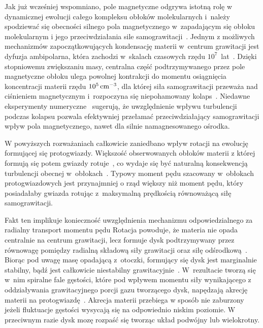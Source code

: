 \par Jak już wcześniej wspomniano, pole magnetyczne odgrywa istotną rolę w
dynamicznej ewolucji całego kompleksu obłoków molekularnych i~należy spodziewać
się obecności silnego pola magnetycznego w~zapadającym się obłoku molekularnym i
jego przeciwdziałania sile samograwitacji~\cite{MC99}. Jednym z możliwych
mechanizmów zapoczątkowujących kondensację materii w~centrum grawitacji jest
dyfuzja ambipolarna, która zachodzi w~skalach czasowych rzędu
$10^7$~lat~\cite{MZGH93}.  Dzięki stopniowemu zwiększaniu masy, centralna część
podtrzymywanego przez pole magnetyczne obłoku ulega powolnej kontrakcji do
momentu osiągnięcia koncentracji materii rzędu $10^{5}\hbox{$\thinspace\textrm{cm}$}^{-3}$, dla której
siła samograwitacji przeważa nad ciśnieniem magnetycznym i~rozpoczyna się
niepohamowany kolaps~\cite{BM94, CB00}. Niedawne eksperymenty
numeryczne~\cite{JHCF13} sugerują, że uwzględnienie wpływu turbulencji podczas
kolapsu pozwala efektywniej przełamać przeciwdziałający samograwitacji wpływ
pola magnetycznego, nawet dla silnie namagnesowanego ośrodka.

\par W powyższych rozważaniach całkowicie zaniedbano wpływ rotacji na ewolucję
formującej się protogwiazdy. Większość obserwowanych obłoków materii z której
formują się potem gwiazdy rotuje~\cite{GBFM93}, co wydaje się być naturalną
konsekwencją turbulencji obecnej w~obłokach~\cite{BB00}. Typowy moment pędu
szacowany w~obłokach protogwiazdowych jest przynajmniej o rząd większy niż
moment pędu, który posiadałaby gwiazda rotując z~maksymalną prędkością
równoważącą siłę samograwitacji. 

Fakt ten implikuje konieczność uwzględnienia mechanizmu odpowiedzialnego za
radialny transport momentu pędu Rotacja powoduje, że materia nie opada
centralnie na centrum grawitacji, lecz formuje dysk podtrzymywany przez
równowagę pomiędzy radialną składową siły grawitacji oraz siłę
odśrodkową~\cite{TSC84}. Biorąc pod uwagę masę opadającą z~otoczki, formujący
się dysk jest marginalnie stabilny, bądź jest całkowicie niestabilny
grawitacyjnie~\cite{SKBT94}. W~rezultacie tworzą się w~nim spiralne fale
gęstości, które pod wpływem momentu siły wynikającego z oddziaływania
grawitacyjnego porcji gazu tworzącego dysk, napędzają akrecję materii na
protogwiazdę~\cite{St00}.
Akrecja materii przebiega w sposób nie zaburzony jeżeli fluktuacje gęstości
wysycają się na odpowiednio niskim poziomie. W przeciwnym razie dysk mozę
rozpaść się tworząc układ podwójny lub wielokrotny.


